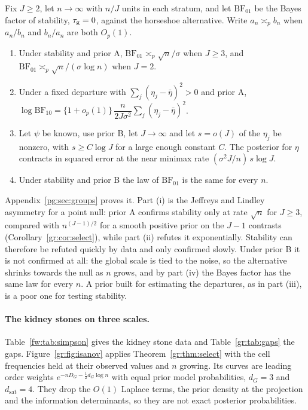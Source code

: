 \begin{proposition}\label{gr:prop:hstest}
Fix $J\ge2$, let $n\to\infty$ with $n/J$ units in each stratum, and let $\mathrm{BF}_{01}$ be the Bayes factor of stability, $\tau_{\mathrm{g}}=0$, against the horseshoe alternative. Write $a_n\asymp_pb_n$ when $a_n/b_n$ and $b_n/a_n$ are both $O_p(1)$.
\begin{enumerate}
\item[(i)] Under stability and prior A, $\mathrm{BF}_{01}\asymp_p\sqrt n/\sigma$ when $J\ge3$, and $\mathrm{BF}_{01}\asymp_p\sqrt n/(\sigma\log n)$ when $J=2$.
\item[(ii)] Under a fixed departure with $\sum_j(\eta_j-\bar\eta)^2>0$ and prior A, $\log\mathrm{BF}_{10}=\{1+o_p(1)\}\,\dfrac{n}{2J\sigma^2}\sum_j(\eta_j-\bar\eta)^2$.
\item[(iii)] Let $\psi$ be known, use prior B, let $J\to\infty$ and let $s=o(J)$ of the $\eta_j$ be nonzero, with $s\ge C\log J$ for a large enough constant $C$. The posterior for $\eta$ contracts in squared error at the near minimax rate $(\sigma^2J/n)\,s\log J$.
\item[(iv)] Under stability and prior B the law of $\mathrm{BF}_{01}$ is the same for every $n$.
\end{enumerate}
\end{proposition}

Appendix~\ref{pg:sec:groups} proves it. Part (i) is the Jeffreys and Lindley asymmetry for a point null: prior A confirms stability only at rate $\sqrt n$ for $J\ge3$, compared with $n^{(J-1)/2}$ for a smooth positive prior on the $J-1$ contrasts (Corollary~\ref{gr:cor:select}), while part (ii) refutes it exponentially. Stability can therefore be refuted quickly by data and only confirmed slowly. Under prior B it is not confirmed at all: the global scale is tied to the noise, so the alternative shrinks towards the null as $n$ grows, and by part (iv) the Bayes factor has the same law for every $n$. A prior built for estimating the departures, as in part (iii), is a poor one for testing stability.

\paragraph{The kidney stones on three scales.}
Table~\ref{fw:tab:simpson} gives the kidney stone data and Table~\ref{gr:tab:gaps} the gaps. Figure~\ref{gr:fig:isanov} applies Theorem~\ref{gr:thm:select} with the cell frequencies held at their observed values and $n$ growing. Its curves are leading order weights $e^{-nD_G-\frac12d_G\log n}$ with equal prior model probabilities, $d_G=3$ and $d_{\mathrm{sat}}=4$. They drop the $O(1)$ Laplace terms, the prior density at the projection and the information determinants, so they are not exact posterior probabilities.


